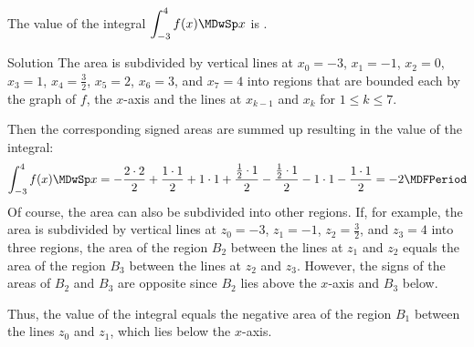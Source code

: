 \begin{MExercises}
\begin{MExercise}
The value of the integral 
$\displaystyle \int_{-3}^{4} f(x) \MDwSp x$
is .

\begin{MHint}{Solution}
The area is subdivided by vertical lines at $x_0 = -3$, $x_1 = -1$, $x_2 = 0$, $x_3 = 1$,
$x_4 = \frac{3}{2}$, $x_5 = 2$, $x_6 = 3$, and $x_7 = 4$ into regions that are bounded each 
by the graph of $f$, the $x$-axis and the lines at $x_{k-1}$ and $x_k$ for $1 \leq k \leq 7$.

Then the corresponding signed areas are summed up resulting in the value of the integral:
\[
\int_{-3}^{4} f(x) \MDwSp x %
= -\frac{2 \cdot 2}{2} + \frac{1 \cdot 1}{2} + 1 \cdot 1 %
 + \frac{\frac{1}{2} \cdot 1}{2}
 - \frac{\frac{1}{2} \cdot 1}{2}
 - 1 \cdot 1 - \frac{1 \cdot 1}{2} %
= -2\MDFPeriod %
\]
Of course, the area can also be subdivided into other regions. If, for example, 
the area is subdivided by vertical lines at $z_0 = -3$, $z_1 = -1$, $z_2 = \frac{3}{2}$, and $z_3 = 4$
into three regions, the area of the region $B_2$ between the lines at $z_1$ and $z_2$ equals 
the area of the region $B_3$ between the lines at $z_2$ and $z_3$. However, the signs of the areas of $B_2$ and $B_3$
are opposite since $B_2$ lies above the $x$-axis and $B_3$ below.
\begin{center}
\end{center}
Thus, the value of the integral equals the negative area of the region $B_1$ between 
the lines $z_0$ and $z_1$, which lies below the $x$-axis.
\end{MHint}
\end{MExercise}



\end{MExercises}
